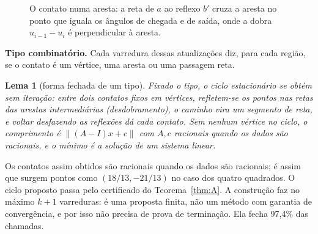 \documentclass[11pt]{article}
\theoremstyle{plain}
\newtheorem{lema}{Lema}
\theoremstyle{remark}
\newcommand{\sect}[1]{\par\bigskip{\color{navy}\large\bfseries #1\par}\smallskip}
\begin{document}
\begin{figure}[h]
\centering
{}
\caption{O contato numa aresta: a reta de $a$ ao reflexo $b'$ cruza a aresta no ponto que
iguala os ângulos de chegada e de saída, onde a dobra $u_{i-1}-u_i$ é perpendicular à aresta.}
\label{fig:heron}
\end{figure}

\textbf{Tipo combinatório.} Cada varredura dessas atualizações diz, para cada região,
se o contato é um vértice, uma aresta ou uma passagem reta.

\begin{lema}[forma fechada de um tipo]\label{lem:closed}
Fixado o tipo, o ciclo estacionário se obtém sem iteração: entre dois contatos fixos em
vértices, refletem-se os pontos nas retas das arestas intermediárias (desdobramento), o
caminho vira um segmento de reta, e voltar desfazendo as reflexões dá cada contato.
Sem nenhum vértice no ciclo, o comprimento é $\lVert (A-I)x+c\rVert$ com $A,c$ racionais
quando os dados são racionais, e o mínimo é a solução de um sistema linear.
\end{lema}

Os contatos assim obtidos são racionais quando os dados são racionais; é assim que surgem
pontos como $(18/13,-21/13)$ no caso dos quatro quadrados. O ciclo proposto passa pelo
certificado do Teorema~\ref{thm:A}. A construção faz no máximo $k+1$ varreduras: é uma
proposta finita, não um método com garantia de convergência, e por isso não precisa de
prova de terminação. Ela fecha 97{,}4\% das chamadas.

\sect{3. O polimento por pontos interiores}
\end{document}
